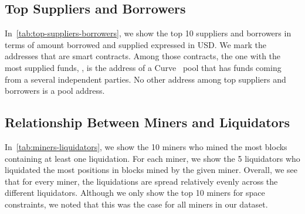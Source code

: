 \subsection{Top Suppliers and Borrowers}
\label{sec:top-suppliers-borrowers}
In~\autoref{tab:top-suppliers-borrowers}, we show the top 10 suppliers and borrowers in terms of amount borrowed and supplied expressed in USD.
We mark the addresses that are smart contracts. Among those contracts, the one with the most supplied funds, , is the address of a Curve~\cite{web:curve} pool that has funds coming from a several independent parties.
No other address among top suppliers and borrowers is a pool address.

\subsection{Relationship Between Miners and Liquidators}
\label{sec:miners-liquidators}
In~\autoref{tab:miners-liquidators}, we show the 10 miners who mined the most blocks containing at least one liquidation.
For each miner, we show the 5 liquidators who liquidated the most positions in blocks mined by the given miner.
Overall, we see that for every miner, the liquidations are spread relatively evenly across the different liquidators.
Although we only show the top 10 miners for space constraints, we noted that this was the case for all miners in our dataset.


\hypersetup{hidelinks}

